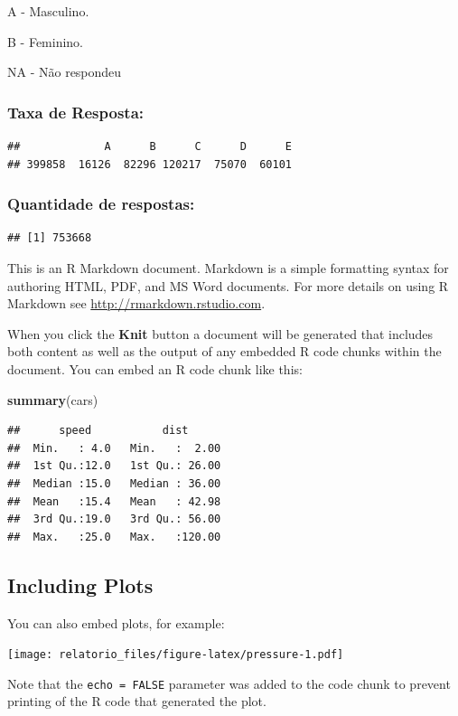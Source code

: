 \documentclass[]{article}
\newenvironment{Shaded}{\begin{snugshade}}{\end{snugshade}}
\newcommand{\KeywordTok}[1]{\textcolor[rgb]{0.13,0.29,0.53}{\textbf{#1}}}
\newcommand{\NormalTok}[1]{#1}
\begin{document}
A - Masculino.

B - Feminino.

NA - Não respondeu

\hypertarget{taxa-de-resposta-1}{%
\subsubsection{Taxa de Resposta:}\label{taxa-de-resposta-1}}

\begin{verbatim}
##             A      B      C      D      E 
## 399858  16126  82296 120217  75070  60101
\end{verbatim}

\hypertarget{quantidade-de-respostas-1}{%
\subsubsection{Quantidade de
respostas:}\label{quantidade-de-respostas-1}}

\begin{verbatim}
## [1] 753668
\end{verbatim}

This is an R Markdown document. Markdown is a simple formatting syntax
for authoring HTML, PDF, and MS Word documents. For more details on
using R Markdown see \url{http://rmarkdown.rstudio.com}.

When you click the \textbf{Knit} button a document will be generated
that includes both content as well as the output of any embedded R code
chunks within the document. You can embed an R code chunk like this:

\begin{Shaded}
\begin{Highlighting}[]
\KeywordTok{summary}\NormalTok{(cars)}
\end{Highlighting}
\end{Shaded}

\begin{verbatim}
##      speed           dist       
##  Min.   : 4.0   Min.   :  2.00  
##  1st Qu.:12.0   1st Qu.: 26.00  
##  Median :15.0   Median : 36.00  
##  Mean   :15.4   Mean   : 42.98  
##  3rd Qu.:19.0   3rd Qu.: 56.00  
##  Max.   :25.0   Max.   :120.00
\end{verbatim}

\hypertarget{including-plots}{%
\subsection{Including Plots}\label{including-plots}}

You can also embed plots, for example:

\texttt{[image: relatorio\_files/figure-latex/pressure-1.pdf]}

Note that the \texttt{echo\ =\ FALSE} parameter was added to the code
chunk to prevent printing of the R code that generated the plot.
\end{document}
